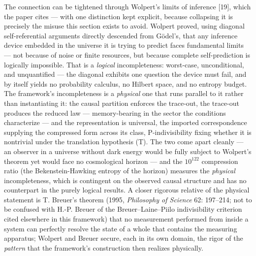\documentclass[
]{article}
\begin{document}
The connection can be tightened through Wolpert's limits of inference
{[}19{]}, which the paper cites --- with one distinction kept explicit,
because collapsing it is precisely the misuse this section exists to
avoid. Wolpert proved, using diagonal self-referential arguments
directly descended from Gödel's, that any inference device embedded in
the universe it is trying to predict faces fundamental limits --- not
because of noise or finite resources, but because complete
self-prediction is logically impossible. That is a \emph{logical}
incompleteness: worst-case, unconditional, and unquantified --- the
diagonal exhibits one question the device must fail, and by itself
yields no probability calculus, no Hilbert space, and no entropy budget.
The framework's incompleteness is a \emph{physical} one that runs
parallel to it rather than instantiating it: the causal partition
enforces the trace-out, the trace-out produces the reduced law ---
memory-bearing in the sector the conditions characterize --- and the
representation is universal, the imported correspondence supplying the
compressed form across its class, P-indivisibility fixing whether it is
nontrivial under the translation hypothesis (T). The two come apart
cleanly --- an observer in a universe without dark energy would be fully
subject to Wolpert's theorem yet would face no cosmological horizon ---
and the \(10^{122}\) compression ratio (the Bekenstein-Hawking entropy
of the horizon) measures the \emph{physical} incompleteness, which is
contingent on the observed causal structure and has no counterpart in
the purely logical results. A closer rigorous relative of the physical
statement is T. Breuer's theorem (1995, \emph{Philosophy of Science} 62:
197--214; not to be confused with H.-P. Breuer of the
Breuer--Laine--Piilo indivisibility criterion cited elsewhere in this
framework) that no measurement performed from inside a system can
perfectly resolve the state of a whole that contains the measuring
apparatus; Wolpert and Breuer secure, each in its own domain, the rigor
of the \emph{pattern} that the framework's construction then realizes
physically.
\end{document}
